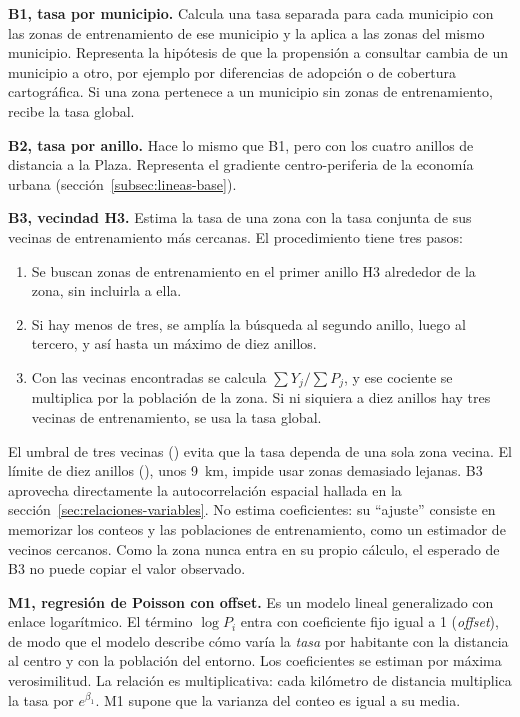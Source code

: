 \textbf{B1, tasa por municipio.} Calcula una tasa separada para cada municipio con las
zonas de entrenamiento de ese municipio y la aplica a las zonas del mismo municipio.
Representa la hipótesis de que la propensión a consultar cambia de un municipio a otro,
por ejemplo por diferencias de adopción o de cobertura cartográfica. Si una zona pertenece
a un municipio sin zonas de entrenamiento, recibe la tasa global.

\textbf{B2, tasa por anillo.} Hace lo mismo que B1, pero con los cuatro anillos de
distancia a la Plaza. Representa el gradiente centro-periferia de la economía urbana
(sección~\ref{subsec:lineas-base}).

\textbf{B3, vecindad H3.} Estima la tasa de una zona con la tasa conjunta de sus vecinas de
entrenamiento más cercanas. El procedimiento tiene tres pasos:
\begin{enumerate}
  \item Se buscan zonas de entrenamiento en el primer anillo H3 alrededor de la zona, sin
        incluirla a ella.
  \item Si hay menos de tres, se amplía la búsqueda al segundo anillo, luego al tercero, y
        así hasta un máximo de diez anillos.
  \item Con las vecinas encontradas se calcula $\sum Y_j / \sum P_j$, y ese cociente se
        multiplica por la población de la zona. Si ni siquiera a diez anillos hay tres
        vecinas de entrenamiento, se usa la tasa global.
\end{enumerate}
El umbral de tres vecinas () evita que la tasa dependa de una sola zona
vecina. El límite de diez anillos (), unos 9~km, impide usar zonas
demasiado lejanas. B3 aprovecha directamente la autocorrelación espacial hallada en la
sección~\ref{sec:relaciones-variables}. No estima coeficientes: su ``ajuste'' consiste en
memorizar los conteos y las poblaciones de entrenamiento, como un estimador de vecinos
cercanos. Como la zona nunca entra en su propio cálculo, el esperado de B3 no puede copiar
el valor observado.

\textbf{M1, regresión de Poisson con offset.} Es un modelo lineal generalizado con enlace
logarítmico. El término $\log P_i$ entra con coeficiente fijo igual a 1 (\emph{offset}),
de modo que el modelo describe cómo varía la \emph{tasa} por habitante con la distancia al
centro y con la población del entorno. Los coeficientes se estiman por máxima
verosimilitud. La relación es multiplicativa: cada kilómetro de distancia multiplica la
tasa por $e^{\beta_1}$. M1 supone que la varianza del conteo es igual a su media.

